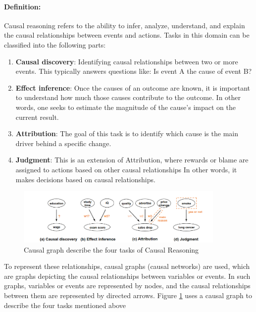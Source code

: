 \paragraph{Definition:} Causal reasoning refers to the ability to infer, analyze, understand, and explain the causal relationships between events and actions. 
Tasks in this domain can be classified into the following parts:

\begin{enumerate}
    \item \textbf{Causal discovery}:  Identifying causal relationships between two or more events. 
    This typically answers questions like: Is event A the cause of event B?

    \item \textbf{Effect inference}:   Once the causes of an outcome are known, it is important to understand how much those causes contribute to the outcome.
    In other words, one seeks to estimate the magnitude of the cause’s impact on the current result.\
    
    \item \textbf{Attribution}: The goal of this task is to identify which cause is the main driver behind a specific change.
    \item \textbf{Judgment}: This is an extension of Attribution, where rewards or blame are assigned to actions based on other causal relationships
    In other words, it makes decisions based on causal relationships. 
\end{enumerate}

\begin{figure}
    \centering
    \includegraphics[width=0.9\textwidth]{Figs/causal_graph.png}
    \caption{Causal graph describe the four tasks of Causal Reasoning}
    \label{fig:causal_graph}
\end{figure}


To represent these relationships, causal graphs (causal networks) are used, which are graphs depicting the causal relationships between variables or events. 
In such graphs, variables or events are represented by nodes, and the causal relationships between them are represented by directed arrows. 
Figure \ref{fig:causal_graph} uses a causal graph to describe the four tasks mentioned above


